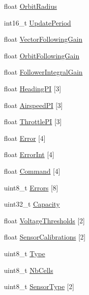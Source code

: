 \begin{DoxyCompactItemize}
float \hyperlink{struct____attribute_____a675a4557be1b35e6beab5eddc925bd2d}{\-Orbit\-Radius}
\item 
int16\-\_\-t \hyperlink{struct____attribute_____ac6d645f026cb0ebc6f93412a8a453186}{\-Update\-Period}
\item 
float \hyperlink{struct____attribute_____a01ed0c8efb8cf9a6e6783ca85a47f7b4}{\-Vector\-Following\-Gain}
\item 
float \hyperlink{struct____attribute_____a58a226ce647941db9f8dcbefe7c8fa71}{\-Orbit\-Following\-Gain}
\item 
float \hyperlink{struct____attribute_____a732558c43bd8cbff402b59a298d4585f}{\-Follower\-Integral\-Gain}
\item 
float \hyperlink{struct____attribute_____aea876ad21cec8fc5d424692e080f189d}{\-Heading\-P\-I} \mbox{[}3\mbox{]}
\item 
float \hyperlink{struct____attribute_____ad0d7b81282897792e9782594fa3d8179}{\-Airspeed\-P\-I} \mbox{[}3\mbox{]}
\item 
float \hyperlink{struct____attribute_____afd75482c2ab017a5118bd7ed8fd3eac1}{\-Throttle\-P\-I} \mbox{[}3\mbox{]}
\item 
float \hyperlink{struct____attribute_____a77e0a7ccf8a14cdc6a31326845221e46}{\-Error} \mbox{[}4\mbox{]}
\item 
float \hyperlink{struct____attribute_____a8dc8601de361687ca85d021c9a864c6d}{\-Error\-Int} \mbox{[}4\mbox{]}
\item 
float \hyperlink{struct____attribute_____af4aa99defadb1677ea6b23de286d4abb}{\-Command} \mbox{[}4\mbox{]}
\item 
uint8\-\_\-t \hyperlink{struct____attribute_____a4d96fdf6b010d6be51941e4a7d3368e0}{\-Errors} \mbox{[}8\mbox{]}
\item 
uint32\-\_\-t \hyperlink{struct____attribute_____affa263efee39cfa5fecd599c9c1151e6}{\-Capacity}
\item 
float \hyperlink{struct____attribute_____a573b73033592ad882de1a30219a4960d}{\-Voltage\-Thresholds} \mbox{[}2\mbox{]}
\item 
float \hyperlink{struct____attribute_____a6948653e69d7d242a920a5f1e6ca233d}{\-Sensor\-Calibrations} \mbox{[}2\mbox{]}
\item 
uint8\-\_\-t \hyperlink{struct____attribute_____a23ebcee49703597918476ca49c44e321}{\-Type}
\item 
uint8\-\_\-t \hyperlink{struct____attribute_____a33c95d5352c0109fc23b5c5aaafadba3}{\-Nb\-Cells}
\item 
uint8\-\_\-t \hyperlink{struct____attribute_____a6ccbef15a2a5346d9aee9af1d7d4dfc1}{\-Sensor\-Type} \mbox{[}2\mbox{]}

\end{DoxyCompactItemize}
